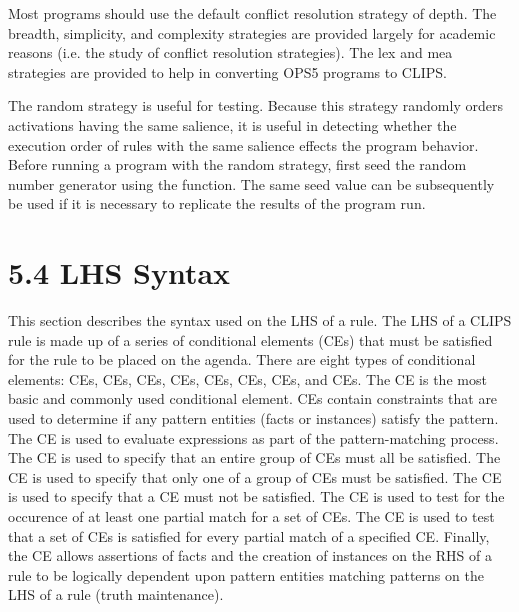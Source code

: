 \documentclass[letterpaper,10pt,english]{sphinxmanual}
\begin{document}
Most programs should use the default conflict resolution strategy of
depth. The breadth, simplicity, and complexity strategies are provided
largely for academic reasons (i.e. the study of conflict resolution
strategies). The lex and mea strategies are provided to help in
converting OPS5 programs to CLIPS.

The random strategy is useful for testing. Because this strategy
randomly orders activations having the same salience, it is useful in
detecting whether the execution order of rules with the same salience
effects the program behavior. Before running a program with the random
strategy, first seed the random number generator using the 
function. The same seed value can be subsequently be used if it is
necessary to replicate the results of the program run.


\section{5.4 LHS Syntax}
\label{\detokenize{defrule:lhs-syntax}}
This section describes the syntax used on the LHS of a rule. The LHS of
a CLIPS rule is made up of a series of conditional elements (CEs) that
must be satisfied for the rule to be placed on the agenda. There are
eight types of conditional elements:  CEs,  CEs,
 CEs,  CEs,  CEs,  CEs,  CEs,
and  CEs. The  CE is the most basic and commonly
used conditional element.  CEs contain constraints that are
used to determine if any pattern entities (facts or instances) satisfy
the pattern. The  CE is used to evaluate expressions as part of
the pattern-matching process. The  CE is used to specify that an
entire group of CEs must all be satisfied. The  CE is used to
specify that only one of a group of CEs must be satisfied. The 
CE is used to specify that a CE must not be satisfied. The  CE
is used to test for the occurence of at least one partial match for a
set of CEs. The  CE is used to test that a set of CEs is
satisfied for every partial match of a specified CE. Finally, the
 CE allows assertions of facts and the creation of instances
on the RHS of a rule to be logically dependent upon pattern entities
matching patterns on the LHS of a rule (truth maintenance).
\end{document}

